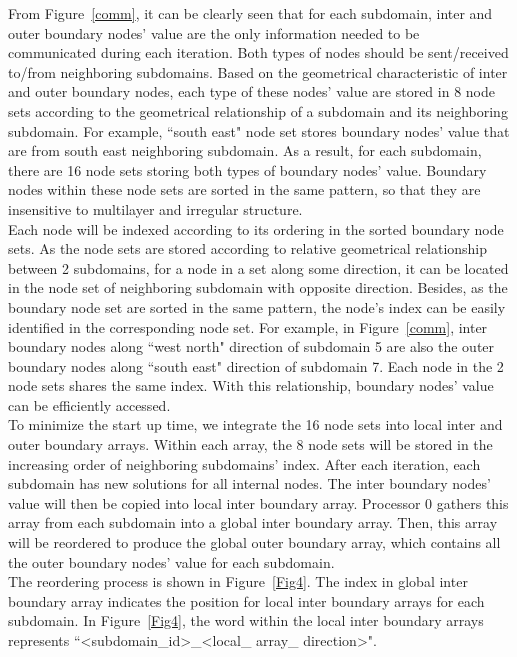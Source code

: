 \documentclass{sig-alternate}
\begin{document}
	From Figure~\ref{comm}, it can be clearly seen that for each subdomain, inter and outer boundary nodes' value 
	are the only information needed to be communicated during each iteration. Both types of nodes should be 
	sent/received to/from neighboring subdomains. Based on the geometrical characteristic of inter and outer boundary nodes, 
	each type of these nodes' value are stored in 8 node sets according to the geometrical relationship of a subdomain and its 
	neighboring subdomain. For example, ``south east" node set stores boundary nodes' value that are from south east neighboring 
	subdomain.
	As a result, for each subdomain, there are 16 node sets storing both types of boundary nodes' value. Boundary nodes within 
	these node sets are sorted in the same pattern, so that they are insensitive to multilayer and irregular structure.\\ 

	Each node will be
	indexed according to its ordering in the sorted boundary node sets. As the node sets are stored according to relative geometrical 
	relationship between 2 subdomains, for a node in
	a set along some direction, it can be located in the node set of neighboring subdomain with opposite direction. Besides, as
	the boundary node set are sorted in the same pattern, the node's index can be easily identified in the corresponding node set.
	For example, in Figure~\ref{comm}, inter boundary nodes along ``west north" 
	direction of subdomain 5 are also the outer boundary nodes along ``south east" direction of subdomain 7. Each node in the 
	2 node sets shares the same index. With this relationship, boundary nodes' value can be efficiently accessed.\\

	To minimize the start up time, we integrate the 16 node sets into local inter and outer boundary arrays. 
	Within each array, the 8 node sets will be stored in the increasing order of neighboring subdomains' index. 
	After each iteration, each subdomain has new solutions for all internal nodes. The inter 
	boundary nodes' value will then be copied into local inter boundary array. Processor 0 gathers this array from each subdomain
	into a global inter boundary array. Then, this array will be reordered to produce the global outer boundary array, which
	contains all the outer boundary nodes' value for each subdomain.\\ 

	The reordering process is shown in Figure~\ref{Fig4}. The index in global inter boundary array indicates the position for
	local inter boundary arrays for each subdomain. In Figure~\ref{Fig4}, the word within the local
	inter boundary arrays represents ``<subdomain\_id>\_<local\_ array\_ direction>".\\	
\end{document}

